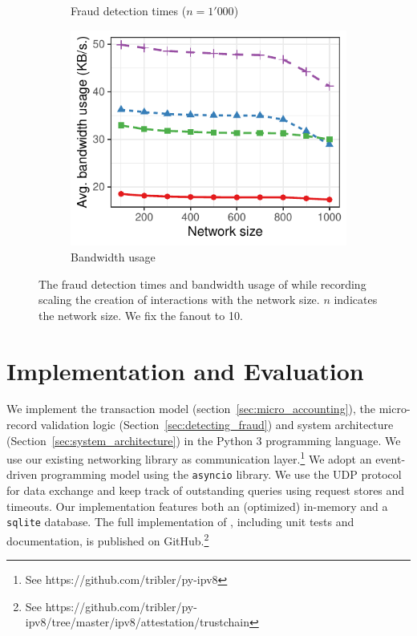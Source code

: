 \begin{figure}[t]
\begin{subfigure}{.66\columnwidth}
		\caption{Fraud detection times ($ n = 1'000 $)}
		\label{fig:fraud_experiment_detect_times_dynamic_1000}
	\end{subfigure}
	\begin{subfigure}{.66\columnwidth}
		\centering
		\includegraphics[width=\columnwidth]{trustchain/assets/fraud_experiment_dynamic_tx_bw}
		\caption{Bandwidth usage}
		\label{fig:fraud_experiment_dynamic_tx_bw}
	\end{subfigure}%
	\caption{The fraud detection times and bandwidth usage of \ModelName{} while recording scaling the creation of interactions with the network size. $ n $ indicates the network size. We fix the fanout to 10.}
	\label{fig:fraud_experiments_dynamic_tx}
\end{figure}

\section{Implementation and Evaluation}
\label{sec:implementation_evaluation}
We implement the \ModelName{} transaction model (section~\ref{sec:micro_accounting}), the micro-record validation logic (Section~\ref{sec:detecting_fraud}) and system architecture (Section~\ref{sec:system_architecture}) in the Python 3 programming language.
We use our existing networking library as communication layer.\footnote{See https://github.com/tribler/py-ipv8}
We adopt an event-driven programming model using the \texttt{asyncio} library.
We use the UDP protocol for data exchange and keep track of outstanding queries using request stores and timeouts.
Our implementation features both an (optimized) in-memory and a \texttt{sqlite} database.
The full implementation of \ModelName{}, including unit tests and documentation, is published on GitHub.\footnote{See https://github.com/tribler/py-ipv8/tree/master/ipv8/attestation/trustchain}


